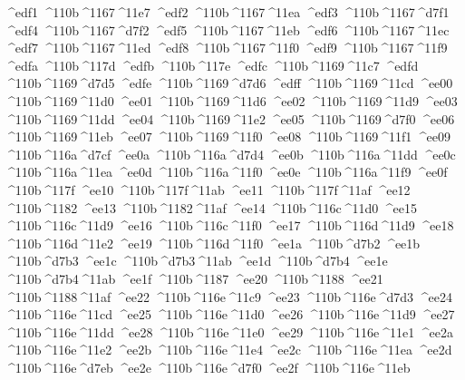 \checkit ^^^^edf1 ^^^^110b^^^^1167^^^^11e7
\checkit ^^^^edf2 ^^^^110b^^^^1167^^^^11ea
\checkit ^^^^edf3 ^^^^110b^^^^1167^^^^d7f1
\checkit ^^^^edf4 ^^^^110b^^^^1167^^^^d7f2
\checkit ^^^^edf5 ^^^^110b^^^^1167^^^^11eb
\checkit ^^^^edf6 ^^^^110b^^^^1167^^^^11ec
\checkit ^^^^edf7 ^^^^110b^^^^1167^^^^11ed
\checkit ^^^^edf8 ^^^^110b^^^^1167^^^^11f0
\checkit ^^^^edf9 ^^^^110b^^^^1167^^^^11f9
\checkit ^^^^edfa ^^^^110b^^^^117d
\checkit ^^^^edfb ^^^^110b^^^^117e
\checkit ^^^^edfc ^^^^110b^^^^1169^^^^11c7
\checkit ^^^^edfd ^^^^110b^^^^1169^^^^d7d5
\checkit ^^^^edfe ^^^^110b^^^^1169^^^^d7d6
\checkit ^^^^edff ^^^^110b^^^^1169^^^^11cd
\checkit ^^^^ee00 ^^^^110b^^^^1169^^^^11d0
\checkit ^^^^ee01 ^^^^110b^^^^1169^^^^11d6
\checkit ^^^^ee02 ^^^^110b^^^^1169^^^^11d9
\checkit ^^^^ee03 ^^^^110b^^^^1169^^^^11dd
\checkit ^^^^ee04 ^^^^110b^^^^1169^^^^11e2
\checkit ^^^^ee05 ^^^^110b^^^^1169^^^^d7f0
\checkit ^^^^ee06 ^^^^110b^^^^1169^^^^11eb
\checkit ^^^^ee07 ^^^^110b^^^^1169^^^^11f0
\checkit ^^^^ee08 ^^^^110b^^^^1169^^^^11f1
\checkit ^^^^ee09 ^^^^110b^^^^116a^^^^d7cf
\checkit ^^^^ee0a ^^^^110b^^^^116a^^^^d7d4
\checkit ^^^^ee0b ^^^^110b^^^^116a^^^^11dd
\checkit ^^^^ee0c ^^^^110b^^^^116a^^^^11ea
\checkit ^^^^ee0d ^^^^110b^^^^116a^^^^11f0
\checkit ^^^^ee0e ^^^^110b^^^^116a^^^^11f9
\checkit ^^^^ee0f ^^^^110b^^^^117f
\checkit ^^^^ee10 ^^^^110b^^^^117f^^^^11ab
\checkit ^^^^ee11 ^^^^110b^^^^117f^^^^11af
\checkit ^^^^ee12 ^^^^110b^^^^1182
\checkit ^^^^ee13 ^^^^110b^^^^1182^^^^11af
\checkit ^^^^ee14 ^^^^110b^^^^116c^^^^11d0
\checkit ^^^^ee15 ^^^^110b^^^^116c^^^^11d9
\checkit ^^^^ee16 ^^^^110b^^^^116c^^^^11f0
\checkit ^^^^ee17 ^^^^110b^^^^116d^^^^11d9
\checkit ^^^^ee18 ^^^^110b^^^^116d^^^^11e2
\checkit ^^^^ee19 ^^^^110b^^^^116d^^^^11f0
\checkit ^^^^ee1a ^^^^110b^^^^d7b2
\checkit ^^^^ee1b ^^^^110b^^^^d7b3
\checkit ^^^^ee1c ^^^^110b^^^^d7b3^^^^11ab
\checkit ^^^^ee1d ^^^^110b^^^^d7b4
\checkit ^^^^ee1e ^^^^110b^^^^d7b4^^^^11ab
\checkit ^^^^ee1f ^^^^110b^^^^1187
\checkit ^^^^ee20 ^^^^110b^^^^1188
\checkit ^^^^ee21 ^^^^110b^^^^1188^^^^11af
\checkit ^^^^ee22 ^^^^110b^^^^116e^^^^11c9
\checkit ^^^^ee23 ^^^^110b^^^^116e^^^^d7d3
\checkit ^^^^ee24 ^^^^110b^^^^116e^^^^11cd
\checkit ^^^^ee25 ^^^^110b^^^^116e^^^^11d0
\checkit ^^^^ee26 ^^^^110b^^^^116e^^^^11d9
\checkit ^^^^ee27 ^^^^110b^^^^116e^^^^11dd
\checkit ^^^^ee28 ^^^^110b^^^^116e^^^^11e0
\checkit ^^^^ee29 ^^^^110b^^^^116e^^^^11e1
\checkit ^^^^ee2a ^^^^110b^^^^116e^^^^11e2
\checkit ^^^^ee2b ^^^^110b^^^^116e^^^^11e4
\checkit ^^^^ee2c ^^^^110b^^^^116e^^^^11ea
\checkit ^^^^ee2d ^^^^110b^^^^116e^^^^d7eb
\checkit ^^^^ee2e ^^^^110b^^^^116e^^^^d7f0
\checkit ^^^^ee2f ^^^^110b^^^^116e^^^^11eb
